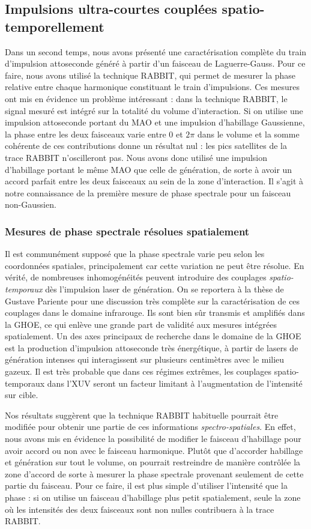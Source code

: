 \subsection{Impulsions ultra-courtes couplées spatio-temporellement}
Dans un second temps, nous avons présenté une caractérisation complète du train d'impulsion attoseconde généré à partir d'un faisceau de Laguerre-Gauss. Pour ce faire, nous avons utilisé la technique RABBIT, qui permet de mesurer la phase relative entre chaque harmonique constituant le train d'impulsions. Ces mesures ont mis en évidence un problème intéressant : dans la technique RABBIT, le signal mesuré est intégré sur la totalité du volume d'interaction. Si on utilise une impulsion attoseconde portant du MAO et une impulsion d'habillage Gaussienne, la phase entre les deux faisceaux varie entre 0 et $2\pi$ dans le volume et la somme cohérente de ces contributions donne un résultat nul : les pics satellites de la trace RABBIT n'oscilleront pas. Nous avons donc utilisé une impulsion d'habillage portant le même MAO que celle de génération, de sorte à avoir un accord parfait entre les deux faisceaux au sein de la zone d'interaction. Il s'agit à notre connaissance de la première mesure de phase spectrale pour un faisceau non-Gaussien.

\subsubsection{Mesures de phase spectrale résolues spatialement}
Il est communément supposé que la phase spectrale varie peu selon les coordonnées spatiales, principalement car cette variation ne peut être résolue. En vérité, de nombreuses inhomogénéités peuvent introduire des couplages \textit{spatio-temporaux} dès l'impulsion laser de génération. On se reportera à la thèse de Gustave Pariente pour une discussion très complète sur la caractérisation de ces couplages dans le domaine infrarouge. Ils sont bien sûr transmis et amplifiés dans la GHOE, ce qui enlève une grande part de validité aux mesures intégrées spatialement. Un des axes principaux de recherche dans le domaine de la GHOE est la production d'impulsion attoseconde très énergétique, à partir de lasers de génération intenses qui interagissent sur plusieurs centimètres avec le milieu gazeux. Il est très probable que dans ces régimes extrêmes, les couplages spatio-temporaux dans l'XUV seront un facteur limitant à l'augmentation de l'intensité sur cible.

Nos résultats suggèrent que la technique RABBIT habituelle pourrait être modifiée pour obtenir une partie de ces informations \textit{spectro-spatiales}. En effet, nous avons mis en évidence la possibilité de modifier le faisceau d'habillage pour avoir accord ou non avec le faisceau harmonique. Plutôt que d'accorder habillage et génération sur tout le volume, on pourrait restreindre de manière contrôlée la zone d'accord de sorte à mesurer la phase spectrale provenant seulement de cette partie du faisceau. Pour ce faire, il est plus simple d'utiliser l'intensité que la phase : si on utilise un faisceau d'habillage plus petit spatialement, seule la zone où les intensités des deux faisceaux sont non nulles contribuera à la trace RABBIT. 

